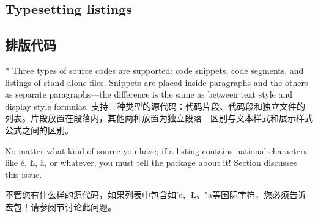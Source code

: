 \begin{paracol}{2}
\subsection{Typesetting listings}
\switchcolumn
\subsection{排版代码}
\switchcolumn[0]*%
Three types of source codes are supported: code snippets, code segments, and
listings of stand alone files.  Snippets are placed inside paragraphs and the
others as separate paragraphs---the difference is the same as between text
style and display style formulas.
\switchcolumn
支持三种类型的源代码：代码片段、代码段和独立文件的列表。片段放置在段落内，其他两种放置为独立段落---区别与文本样式和展示样式公式之间的区别。
\end{paracol}
\begin{advise}
\begin{paracol}{2}

\item No matter what kind of source you have, if a listing contains national
    characters like \'e, \L, \"a, or whatever, you must tell the
    package about it! Section  discusses this issue.
    \switchcolumn
    \item 不管您有什么样的源代码，如果列表中包含如'e、\L、"a等国际字符，您必须告诉宏包！请参阅节讨论此问题。      
\end{paracol}
\end{advise}

